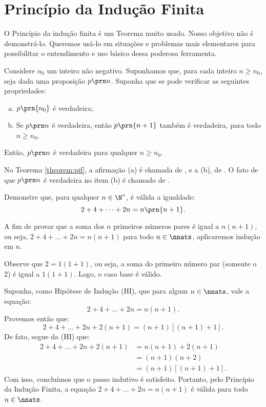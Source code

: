 \section{Princípio da Indução Finita}

O Princípio da indução finita é um Teorema muito usado. Nosso objetivo não é demonstrá-lo. Queremos usá-lo em situações e problemas mais elementares para possibilitar o entendimento e uso básico dessa poderosa ferramenta.

\begin{theorem}
\label{theorem:pif}
Considere $n_0$ um inteiro não negativo. Suponhamos que, para cada inteiro $n \geq n_0$, seja dada uma proposição $p \prn n$. Suponha
que se pode verificar as seguintes propriedades:

\begin{enumerate}[(a)]
  \item $p \prn{n_0}$ é verdadeira;
  \item Se $p \prn n$ é verdadeira, então $p \prn {n+1}$ também
  é verdadeira, para todo $n \geq n_0$.
\end{enumerate}

\noindent Então, $p \prn n$ é verdadeira para qualquer $n \geq n_0$.
\end{theorem}

\begin{remark}
No Teorema \ref{theorem:pif}, a afirmação (a) é chamada de , e a (b), de . O fato de que $p \prn n$ é verdadeira no item (b) é chamado de .
\end{remark}

\begin{example}
Demonstre que, para qualquer $n \in \N^*$, é válida a igualdade:
%
$$2+ 4+ \dots + 2n = n \prn {n+1}.$$
\end{example}


\begin{solution}
	A fim de provar que a soma dos $n$ primeiros números pares é igual a $n(n+1)$, ou seja, $2+4+\dots + 2n = n(n+1)$ para todo $n \in \nnats$, aplicaremos indução em $n$.
	
	Observe que $2 = 1(1+1)$, ou seja, a soma do primeiro número par (somente o 2) é igual a $1(1+1)$. Logo, o caso base é válido.
	
	Suponha, como Hipótese de Indução (HI), que para algum $n \in \nnats$, vale a equação:
	$$2+4+\dots+2n=n(n+1).$$
	Provemos então que:
	$$2+4+\dots + 2n + 2(n+1) = (n+1)[(n+1)+1].$$
	De fato, segue da (HI) que:
	\begin{align*}
	2+4+\dots+2n +2(n+1)	&= n(n+1) + 2(n+1) \\
	&= (n+1)(n+2) \\
	&= (n+1)[(n+1)+1].
	\end{align*}
	Com isso, concluímos que o passo indutivo é satisfeito.
	Portanto, pelo Princípio da Indução Finita, a equação $2+4+\dots + 2n=n(n+1)$ é válida para todo $n \in \nnats$.
	\end{solution}


